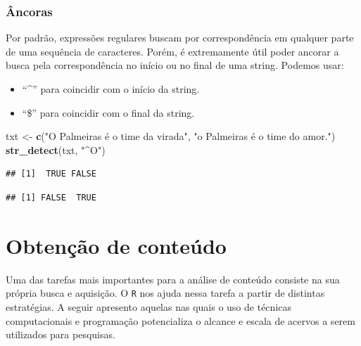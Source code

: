 \documentclass[]{book}
\newenvironment{Shaded}{\begin{snugshade}}{\end{snugshade}}
\newcommand{\CharTok}[1]{\textcolor[rgb]{0.31,0.60,0.02}{#1}}
\newcommand{\KeywordTok}[1]{\textcolor[rgb]{0.13,0.29,0.53}{\textbf{#1}}}
\newcommand{\NormalTok}[1]{#1}
\newcommand{\StringTok}[1]{\textcolor[rgb]{0.31,0.60,0.02}{#1}}
\providecommand{\tightlist}{%
  \setlength{\itemsep}{0pt}\setlength{\parskip}{0pt}}
\begin{document}
\hypertarget{uxe2ncoras}{%
\subsection{Âncoras}\label{uxe2ncoras}}

Por padrão, expressões regulares buscam por correspondência em qualquer parte de uma sequência de caracteres. Porém, é extremamente útil poder ancorar a busca pela correspondência no início ou no final de uma string. Podemos usar:

\begin{itemize}
\tightlist
\item
  ``\^{}'' para coincidir com o início da string.
\item
  ``\$'' para coincidir com o final da string.
\end{itemize}

\begin{Shaded}
\begin{Highlighting}[]
\NormalTok{txt <-}\StringTok{ }\KeywordTok{c}\NormalTok{(}\StringTok{"O Palmeiras é o time da virada"}\NormalTok{, }\StringTok{"o Palmeiras é o time do amor."}\NormalTok{)}
\KeywordTok{str_detect}\NormalTok{(txt, }\StringTok{"^O"}\NormalTok{)}
\end{Highlighting}
\end{Shaded}

\begin{verbatim}
## [1]  TRUE FALSE
\end{verbatim}

\begin{Shaded}
\end{Shaded}

\begin{verbatim}
## [1] FALSE  TRUE
\end{verbatim}

\hypertarget{scrape}{%
\chapter{Obtenção de conteúdo}\label{scrape}}

Uma das tarefas mais importantes para a análise de conteúdo consiste na sua própria
busca e aquisição. O \texttt{R} nos ajuda nessa tarefa a partir de distintas estratégias.
A seguir apresento aquelas nas quais o uso de técnicas computacionais e programação
potencializa o alcance e escala de acervos a serem utilizados para pesquisas.
\end{document}
